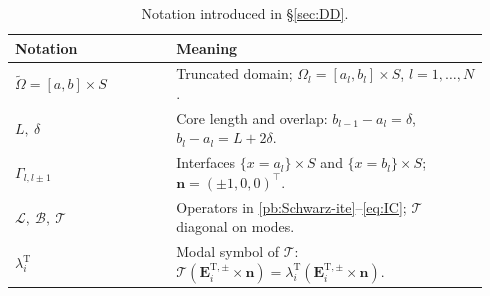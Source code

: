 \documentclass[smallextended]{svjour3}       %
\begin{document}
{\begin{table}[t]
\centering
\scriptsize
\setlength{\tabcolsep}{3pt}
\renewcommand{\arraystretch}{1.08}
\begin{tabular}{@{}p{0.32\linewidth}p{0.62\linewidth}@{}}
\hline
\textbf{Notation} & \textbf{Meaning} \\
\hline
$\widetilde{\Omega}=[a,b]\times S$ & Truncated domain; $\Omega_l=[a_l,b_l]\times S$, $l=1,\dots,N$. \\
$L,\ \delta$ & Core length and overlap: $b_{l-1}-a_l=\delta$, $b_l-a_l=L+2\delta$. \\
$\Gamma_{l,l\pm1}$ & Interfaces $\{x=a_l\}\times S$ and $\{x=b_l\}\times S$; $\mathbf n=(\pm1,0,0)^{\top}$. \\
$\mathcal L,\ \mathcal B,\ \mathcal T$ & Operators in \eqref{pb:Schwarz-ite}--\eqref{eq:IC}; $\mathcal T$ diagonal on modes. \\
$\lambda_i^{\mathrm T}$ & Modal symbol of $\mathcal T$: $\mathcal T(\mathbf E_i^{\mathrm T,\pm}\!\times\mathbf n)=\lambda_i^{\mathrm T}(\mathbf E_i^{\mathrm T,\pm}\!\times\mathbf n)$. \\
\hline
\end{tabular}
\caption{Notation introduced in \S\ref{sec:DD}.}
\label{tab:notation-dd}
\end{table}}
\end{document}
